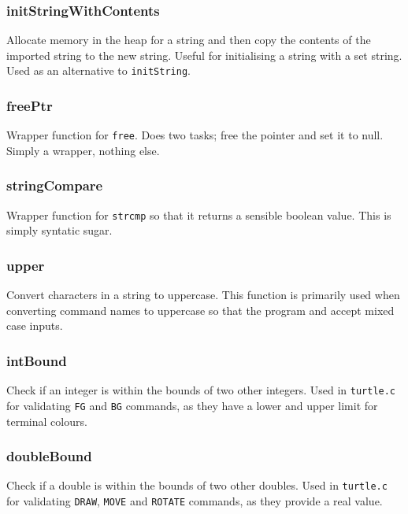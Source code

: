 \documentclass[a4paper, 12pt, titlepage]{article}
\newcommand{\code}[1]{\small\texttt{#1}\normalsize}
\begin{document}
\subsubsection{initStringWithContents}

Allocate memory in the heap for a string and then copy the contents of the
imported string to the new string. Useful for initialising a string with a
set string. Used as an alternative to \code{initString}.

\subsubsection{freePtr}

Wrapper function for \code{free}. Does two tasks; free the pointer and
set it to null. Simply a wrapper, nothing else.

\subsubsection{stringCompare}

Wrapper function for \code{strcmp} so that it returns a sensible boolean
value. This is simply syntatic sugar.

\subsubsection{upper}

Convert characters in a string to uppercase. This function is primarily
used when converting command names to uppercase so that the program and
accept mixed case inputs.

\subsubsection{intBound}

Check if an integer is within the bounds of two other integers. Used in
\code{turtle.c} for validating \code{FG} and \code{BG} commands, as they
have a lower and upper limit for terminal colours.

\subsubsection{doubleBound}

Check if a double is within the bounds of two other doubles. Used in
\code{turtle.c} for validating \code{DRAW}, \code{MOVE} and \code{ROTATE}
commands, as they provide a real value.
\end{document}
